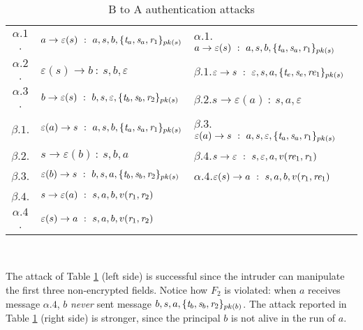 \documentclass{entcs} \usepackage{entcsmacro}
\newcommand{\INT}{\ensuremath{\varepsilon}}
\begin{document}
\begin{table} [h]
\begin{center}
\caption{\label{es_3}  B to A authentication attacks}
\begin{tabular}{|c l|l |} \hline
$\alpha.1$.&$ a \rightarrow \INT(s) \ : \ a,s,b, \{\emph{t}_a, \emph{s}_a,
\emph{r}_1\}_{pk(s)} $
& $\alpha.1$.$ a \rightarrow \INT(s) \ : \ a,s,b, \{\emph{t}_a,
\emph{s}_a,\emph{r}_1\}_{pk(s)} $ \\

$\alpha.2$.&$ \INT(s) \rightarrow b \ : \ s,b,\INT $
&$\beta.1$.$ \INT \rightarrow s \ : \ \INT,s,a, \{\emph{t}_e,
\emph{s}_e,
\emph{re}_1\}_{pk(s)}  $ \\

$\alpha.3$.&$ b \rightarrow \INT(s) \ : \ b,s,\INT, \{\emph{t}_b,
\emph{s}_b, \emph{r}_2\}_{pk(s)} $
& $\beta.2$.$ s \rightarrow \INT(a) \ : \ s,a,\INT $ \\

$\beta.1$.& $ \INT(a) \rightarrow s \ : \ a,s,b, \{\emph{t}_a, \emph{s}_a,
\emph{r}_1\}_{pk(s)} $
&$\beta.3$.$ \INT(a) \rightarrow s \ : \ a,s,\INT, \{\emph{t}_a,
\emph{s}_a,
\emph{r}_1\}_{pk(s)}$ \\

$\beta.2$.&$ s \rightarrow \INT(b) \ : \ s,b,a $
& $\beta.4$.$ s \rightarrow \INT \ : \ s,\INT,a,
v(\emph{re}_1,\emph{r}_1) $ \\

$\beta.3$.&$ \INT(b) \rightarrow s \ : \ b,s,a, \{\emph{t}_b, \emph{s}_b,
\emph{r}_2\}_{pk(s)} $
&$\alpha.4$.$ \INT(s) \rightarrow a \ : \ s,a,b, v(\emph{r}_1,\emph{re}_1) $
\\


$\beta.4$.&$ s \rightarrow \INT(a) \ : \ s,a,b, v(\emph{r}_1,\emph{r}_2) $ &
\\
$\alpha.4$.&$ \INT(s) \rightarrow a \ : \ s,a,b, v(\emph{r}_1,\emph{r}_2) $
& \\
\hline
\end{tabular}\\[0.7mm]
\end{center}
\end{table}

The attack of Table \ref{es_3} (left side) is successful since the
intruder can manipulate the first three non-encrypted fields. Notice
how $F_2$ is violated: when $a$ receives message $\alpha.4$, $b$
\emph{never} sent message $b,s,a, \{\emph{t}_b, \emph{s}_b,
\emph{r}_2\}_{pk(b)}$.  The attack reported in Table \ref{es_3} (right
side) is stronger, since the principal $b$ is not alive in the run of $a$.
\end{document}
